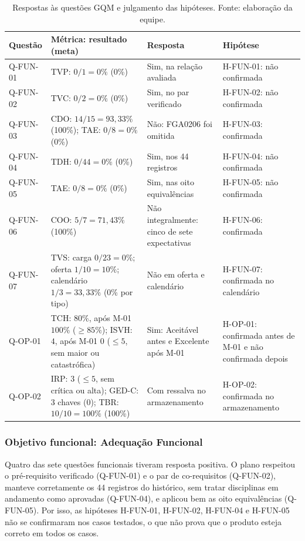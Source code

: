 \documentclass[12pt]{article}
\begin{document}
\begin{table}[!ht]
\centering
\caption{Respostas às questões GQM e julgamento das hipóteses. Fonte: elaboração da
equipe.}
\label{tab:resultados}
\footnotesize
\setlength{\tabcolsep}{4pt}
\begin{tabular}{|I{1.55cm}|L{5.0cm}|L{3.7cm}|L{3.5cm}|}
\hline
\textbf{Questão} & \textbf{Métrica: resultado (meta)} & \textbf{Resposta} & \textbf{Hipótese} \\ \hline
Q-FUN-01 & TVP: $0/1 = 0\%$ (0\%) & Sim, na relação avaliada & H-FUN-01: não confirmada \\ \hline
Q-FUN-02 & TVC: $0/2 = 0\%$ (0\%) & Sim, no par verificado & H-FUN-02: não confirmada \\ \hline
Q-FUN-03 & CDO: $14/15 = 93{,}33\%$ (100\%); TAE: $0/8 = 0\%$ (0\%) & Não: FGA0206 foi omitida & H-FUN-03: confirmada \\ \hline
Q-FUN-04 & TDH: $0/44 = 0\%$ (0\%) & Sim, nos 44 registros & H-FUN-04: não confirmada \\ \hline
Q-FUN-05 & TAE: $0/8 = 0\%$ (0\%) & Sim, nas oito equivalências & H-FUN-05: não confirmada \\ \hline
Q-FUN-06 & COO: $5/7 = 71{,}43\%$ (100\%) & Não integralmente: cinco de sete expectativas & H-FUN-06: confirmada \\ \hline
Q-FUN-07 & TVS: carga $0/23 = 0\%$; oferta $1/10 = 10\%$; calendário $1/3 = 33{,}33\%$ (0\% por tipo) & Não em oferta e calendário & H-FUN-07: confirmada no calendário \\ \hline
Q-OP-01 & TCH: $80\%$, após M-01 $100\%$ ($\geq 85\%$); ISVH: $4$, após M-01 $0$ ($\leq 5$, sem maior ou catastrófica) & Sim: Aceitável antes e Excelente após M-01 & H-OP-01: confirmada antes de M-01 e não confirmada depois \\ \hline
Q-OP-02 & IRP: $3$ ($\leq 5$, sem crítica ou alta); GED-C: 3 chaves (0); TBR: $10/10 = 100\%$ (100\%) & Com ressalva no armazenamento & H-OP-02: confirmada no armazenamento \\ \hline
\end{tabular}
\end{table}

\subsubsection{Objetivo funcional: Adequação Funcional}

Quatro das sete questões funcionais tiveram resposta positiva. O plano respeitou o
pré-requisito verificado (Q-FUN-01) e o par de co-requisitos (Q-FUN-02), manteve
corretamente os 44 registros do histórico, sem tratar disciplinas em andamento como
aprovadas (Q-FUN-04), e aplicou bem as oito equivalências (Q-FUN-05). Por isso, as
hipóteses H-FUN-01, H-FUN-02, H-FUN-04 e H-FUN-05 não se confirmaram nos casos
testados, o que não prova que o produto esteja correto em todos os casos.
\end{document}

